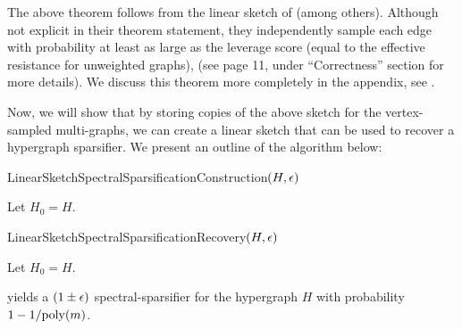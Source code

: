 \documentclass{article}
\begin{document}
The above theorem follows from the linear sketch of \cite{KLMMS14} (among others). Although not explicit in their theorem statement, they independently sample each edge with probability at least as large as the leverage score (equal to the effective resistance for unweighted graphs), (see page 11, under ``{Correctness}'' section for more details). We discuss this theorem more completely in the appendix, see .

Now, we will show that by storing copies of the above sketch for the vertex-sampled multi-graphs, we can create a linear sketch that can be used to recover a hypergraph sparsifier. We present an outline of the algorithm below:

\begin{algorithm}[H]
    \caption{LinearSketchSpectralSparsificationConstruction$(H, \epsilon)$}\label{alg:sketchConstruction}
    Let $H_0 = H$. \\
\end{algorithm}

\begin{algorithm}[H]
    \caption{LinearSketchSpectralSparsificationRecovery$(H, \epsilon)$}\label{alg:sketchRecovery}
    Let $H_0 = H$. \\
\end{algorithm}

\begin{claim}\label{clm:linearSketchAccuracy}
     yields a $(1 \pm \epsilon)$ spectral-sparsifier for the hypergraph $H$ with probability $1 - 1 / \mathrm{poly}(m)$.
\end{claim}
\end{document}
